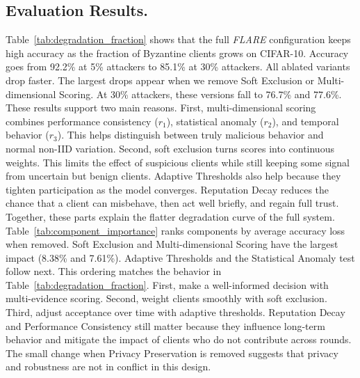 \documentclass[lettersize,journal]{IEEEtran}
\begin{document}
{\subsection{Evaluation Results.}

Table~\ref{tab:degradation_fraction} shows that the full \textit{FLARE} configuration keeps high accuracy as the fraction of Byzantine clients grows on CIFAR-10. Accuracy goes from 92.2\% at 5\% attackers to 85.1\% at 30\% attackers. All ablated variants drop faster. The largest drops appear when we remove Soft Exclusion or Multi-dimensional Scoring. At 30\% attackers, these versions fall to 76.7\% and 77.6\%. These results support two main reasons. First, multi-dimensional scoring combines performance consistency ($r_1$), statistical anomaly ($r_2$), and temporal behavior ($r_3$). This helps distinguish between truly malicious behavior and normal non-IID variation. Second, soft exclusion turns scores into continuous weights. This limits the effect of suspicious clients while still keeping some signal from uncertain but benign clients. Adaptive Thresholds also help because they tighten participation as the model converges. Reputation Decay reduces the chance that a client can misbehave, then act well briefly, and regain full trust. Together, these parts explain the flatter degradation curve of the full system.
Table~\ref{tab:component_importance} ranks components by average accuracy loss when removed. Soft Exclusion and Multi-dimensional Scoring have the largest impact (8.38\% and 7.61\%). Adaptive Thresholds and the Statistical Anomaly test follow next. This ordering matches the behavior in Table~\ref{tab:degradation_fraction}. First, make a well-informed decision with multi-evidence scoring. Second, weight clients smoothly with soft exclusion. Third, adjust acceptance over time with adaptive thresholds. Reputation Decay and Performance Consistency still matter because they influence long-term behavior and mitigate the impact of clients who do not contribute across rounds. The small change when Privacy Preservation is removed suggests that privacy and robustness are not in conflict in this design.

}
\end{document}
